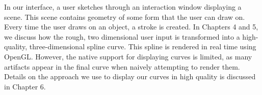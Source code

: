 In our interface, a user sketches through an interaction window displaying a scene.
This scene contains geometry of some form that the user can draw on.
Every time the user draws on an object, a stroke is created.
In Chapters 4 and 5, we discuss how the rough, two dimensional user input is transformed into a high-quality, three-dimensional spline curve.
This spline is rendered in real time using OpenGL.
However, the native support for displaying curves is limited, as many artifacts appear in the final curve when naively attempting to render them.
Details on the approach we use to display our curves in high quality is discussed in Chapter 6.